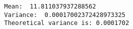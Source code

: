 \documentclass[11pt]{article}
\begin{document}
    \begin{Verbatim}[commandchars=\\\{\}]
Mean:  11.811037937288562
Variance:  0.00017002372428973325
Theoretical variance is: 0.0001702

    \end{Verbatim}

    \begin{center}
    \end{center}
    { \hspace*{\fill} \\}
    

    
    
    
    
\end{document}
